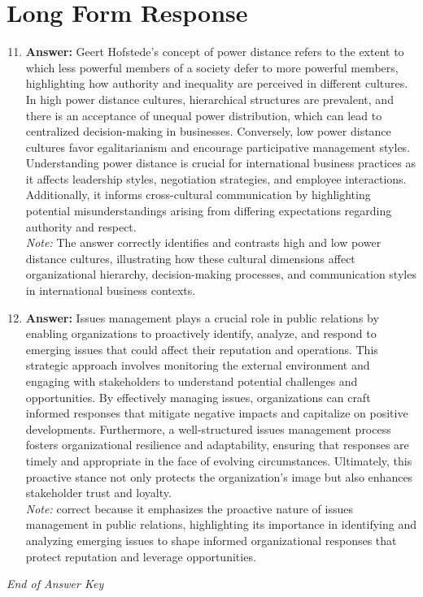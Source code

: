 \documentclass[12pt]{article}
\begin{document}
\section*{Long Form Response}
\begin{enumerate}[label=\arabic*.]
\setcounter{enumi}{10}
\item \textbf{Answer:} Geert Hofstede's concept of power distance refers to the extent to which less powerful members of a society defer to more powerful members, highlighting how authority and inequality are perceived in different cultures. In high power distance cultures, hierarchical structures are prevalent, and there is an acceptance of unequal power distribution, which can lead to centralized decision-making in businesses. Conversely, low power distance cultures favor egalitarianism and encourage participative management styles. Understanding power distance is crucial for international business practices as it affects leadership styles, negotiation strategies, and employee interactions. Additionally, it informs cross-cultural communication by highlighting potential misunderstandings arising from differing expectations regarding authority and respect.
\\ \textit{Note:} The answer correctly identifies and contrasts high and low power distance cultures, illustrating how these cultural dimensions affect organizational hierarchy, decision-making processes, and communication styles in international business contexts.
\item \textbf{Answer:} Issues management plays a crucial role in public relations by enabling organizations to proactively identify, analyze, and respond to emerging issues that could affect their reputation and operations. This strategic approach involves monitoring the external environment and engaging with stakeholders to understand potential challenges and opportunities. By effectively managing issues, organizations can craft informed responses that mitigate negative impacts and capitalize on positive developments. Furthermore, a well-structured issues management process fosters organizational resilience and adaptability, ensuring that responses are timely and appropriate in the face of evolving circumstances. Ultimately, this proactive stance not only protects the organization's image but also enhances stakeholder trust and loyalty.
\\ \textit{Note:} correct because it emphasizes the proactive nature of issues management in public relations, highlighting its importance in identifying and analyzing emerging issues to shape informed organizational responses that protect reputation and leverage opportunities.
\end{enumerate}

\vfill
\noindent\textit{End of Answer Key}
\end{document}
